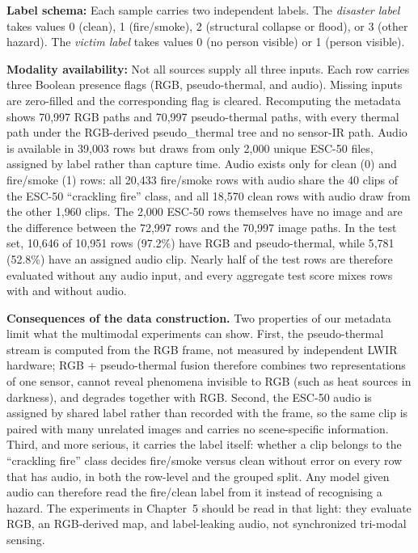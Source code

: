 \textbf{Label schema:} Each sample carries two independent labels. The \textit{disaster label} takes values 0 (clean), 1 (fire/smoke), 2 (structural collapse or flood), or 3 (other hazard). The \textit{victim label} takes values 0 (no person visible) or 1 (person visible).

\textbf{Modality availability:} Not all sources supply all three inputs. Each row carries three Boolean presence flags (RGB, pseudo-thermal, and audio). Missing inputs are zero-filled and the corresponding flag is cleared. Recomputing the metadata shows 70{,}997 RGB paths and 70{,}997 pseudo-thermal paths, with every thermal path under the RGB-derived pseudo\_thermal tree and no sensor-IR path. Audio is available in 39{,}003 rows but draws from only 2{,}000 unique ESC-50 files, assigned by label rather than capture time. Audio exists only for clean (0) and fire/smoke (1) rows: all 20{,}433 fire/smoke rows with audio share the 40 clips of the ESC-50 ``crackling fire'' class, and all 18{,}570 clean rows with audio draw from the other 1{,}960 clips. The 2{,}000 ESC-50 rows themselves have no image and are the difference between the 72{,}997 rows and the 70{,}997 image paths. In the test set, 10{,}646 of 10{,}951 rows (97.2\%) have RGB and pseudo-thermal, while 5{,}781 (52.8\%) have an assigned audio clip. Nearly half of the test rows are therefore evaluated without any audio input, and every aggregate test score mixes rows with and without audio.

\textbf{Consequences of the data construction.} Two properties of our metadata limit what the multimodal experiments can show. First, the pseudo-thermal stream is computed from the RGB frame, not measured by independent LWIR hardware; RGB + pseudo-thermal fusion therefore combines two representations of one sensor, cannot reveal phenomena invisible to RGB (such as heat sources in darkness), and degrades together with RGB. Second, the ESC-50 audio is assigned by shared label rather than recorded with the frame, so the same clip is paired with many unrelated images and carries no scene-specific information. Third, and more serious, it carries the label itself: whether a clip belongs to the ``crackling fire'' class decides fire/smoke versus clean without error on every row that has audio, in both the row-level and the grouped split. Any model given audio can therefore read the fire/clean label from it instead of recognising a hazard. The experiments in Chapter~5 should be read in that light: they evaluate RGB, an RGB-derived map, and label-leaking audio, not synchronized tri-modal sensing.

